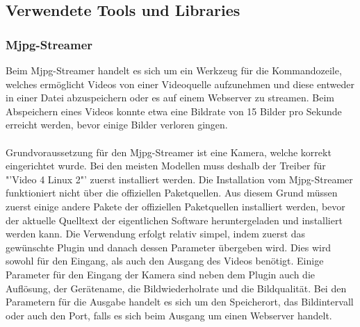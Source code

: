 \subsection{Verwendete Tools und Libraries}
\subsubsection{Mjpg-Streamer}
Beim Mjpg-Streamer handelt es sich um ein Werkzeug für die Kommandozeile, welches ermöglicht Videos von einer Videoquelle aufzunehmen und diese entweder in einer Datei abzuspeichern oder es auf einem Webserver zu streamen. Beim Abspeichern eines Videos konnte etwa eine Bildrate von 15 Bilder pro Sekunde erreicht werden, bevor einige Bilder verloren gingen. \\\\
Grundvoraussetzung für den Mjpg-Streamer ist eine Kamera, welche korrekt eingerichtet wurde. Bei den meisten Modellen muss deshalb der Treiber für "'Video 4 Linux 2"' zuerst installiert werden. Die Installation vom Mjpg-Streamer funktioniert nicht über die offiziellen Paketquellen. Aus diesem Grund müssen zuerst einige andere Pakete der offiziellen Paketquellen installiert werden, bevor der aktuelle Quelltext der eigentlichen Software heruntergeladen und installiert werden kann. Die Verwendung erfolgt relativ simpel, indem zuerst das gewünschte Plugin und danach dessen Parameter übergeben wird. Dies wird sowohl für den Eingang, als auch den Ausgang des Videos benötigt. Einige Parameter für den Eingang der Kamera sind neben dem Plugin auch die Auflösung, der Gerätename, die Bildwiederholrate und die Bildqualität. Bei den Parametern für die Ausgabe handelt es sich um den Speicherort, das Bildintervall oder auch den Port, falls es sich beim Ausgang um einen Webserver handelt. \cite{MjpgStreamer}

